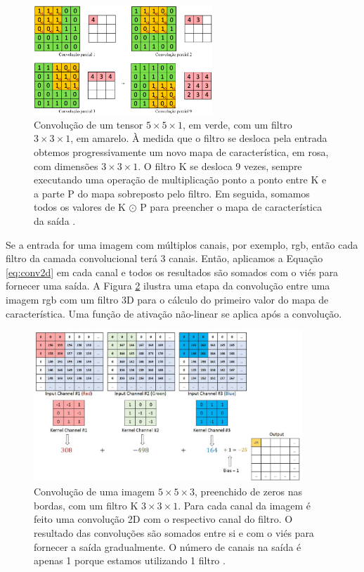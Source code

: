 \begin{figure}[h]
	\centering
	\includegraphics[width=0.6\textwidth]{figuras/conv2D.pdf}
	\caption[Convolução 2D em um mapa de recurso.]{Convolução de um tensor $5 \times 5 \times 1$, em verde, com um filtro $3 \times 3 \times 1$, em amarelo. À medida que o filtro se desloca pela entrada obtemos progressivamente um novo mapa de característica, em rosa, com dimensões $3 \times 3 \times 1$.  O filtro K se desloca 9 vezes, sempre executando uma operação de multiplicação ponto a ponto entre K e a parte P do mapa sobreposto pelo filtro. Em seguida, somamos todos os valores de K $\odot$ P para preencher o mapa de característica da saída \cite{sumit}.}
	\label{fig:con2d}
\end{figure}

Se a entrada for uma imagem com múltiplos canais, por exemplo, \acrshort{rgb}, então cada filtro da camada convolucional terá 3 canais.  Então, aplicamos a Equação \ref{eq:conv2d} em cada canal e todos os resultados são somados com o viés para fornecer uma saída. A Figura \ref{fig:con3d} ilustra uma etapa da convolução entre uma imagem \acrshort{rgb} com um filtro 3D para o cálculo do primeiro valor do mapa de característica. Uma função de ativação não-linear se aplica após a convolução.

\begin{figure}[h]
	\centering
	\includegraphics[width=0.9\textwidth]{figuras/conv3D.pdf}
	\caption[Convolução 2D em três mapas de recursos.]{Convolução de uma imagem  $5 \times 5 \times 3$, preenchido de zeros nas bordas, com um filtro K $3 \times 3 \times 1$. Para cada canal da imagem é feito uma convolução 2D com o respectivo canal do filtro. O resultado das convoluções são somados entre si e com o viés para fornecer a saída gradualmente.  O número de canais na saída é apenas 1 porque estamos utilizando 1 filtro \cite{sumit}.}
	\label{fig:con3d}
\end{figure}


